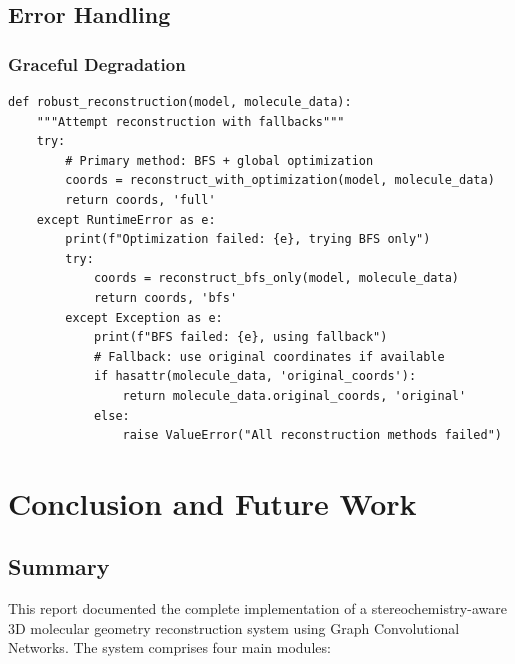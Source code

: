 \documentclass[11pt,a4paper]{article}
\begin{document}
\subsection{Error Handling}

\subsubsection{Graceful Degradation}

\begin{lstlisting}
def robust_reconstruction(model, molecule_data):
    """Attempt reconstruction with fallbacks"""
    try:
        # Primary method: BFS + global optimization
        coords = reconstruct_with_optimization(model, molecule_data)
        return coords, 'full'
    except RuntimeError as e:
        print(f"Optimization failed: {e}, trying BFS only")
        try:
            coords = reconstruct_bfs_only(model, molecule_data)
            return coords, 'bfs'
        except Exception as e:
            print(f"BFS failed: {e}, using fallback")
            # Fallback: use original coordinates if available
            if hasattr(molecule_data, 'original_coords'):
                return molecule_data.original_coords, 'original'
            else:
                raise ValueError("All reconstruction methods failed")
\end{lstlisting}

\clearpage

\section{Conclusion and Future Work}

\subsection{Summary}

This report documented the complete implementation of a stereochemistry-aware 3D molecular geometry reconstruction system using Graph Convolutional Networks. The system comprises four main modules:
\end{document}

